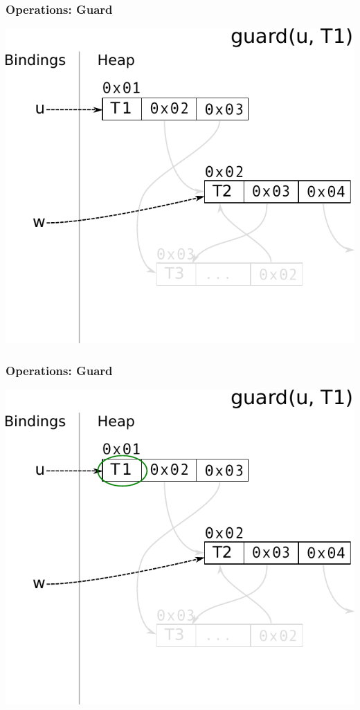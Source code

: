 \documentclass[utf8x]{beamer}
\begin{document}
\begin{frame}[plain]
  \frametitle{Operations: Guard}
  \includegraphics[scale=0.8]{figures/guard01}
\end{frame}

\begin{frame}[plain]
  \frametitle{Operations: Guard}
  \includegraphics[scale=0.8]{figures/guard02}
\end{frame}
\end{document}
